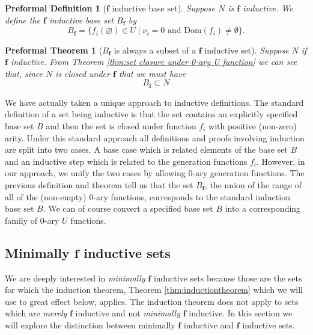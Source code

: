 \documentclass[oneside, 12pt]{book}
\theoremstyle{break}
\newtheorem{preformal definition}[definition]{Preformal Definition}
\newtheorem{preformal theorem}[theorem]{Preformal Theorem}
\newcommand{\bv}[1]{\boldsymbol{#1}}
\begin{document}
				\begin{preformal definition}[$\bv{f}$ inductive base set]
					Suppose $N$ is $\bv{f}$ inductive.
					We define the $\bv{f}$ inductive base set $B_{\bv{f}}$ by
					\begin{equation*}
						B_{\bv{f}} = \{f_i(\varnothing) \in U \mid \nu_i = 0 \text{ and } \text{Dom}(f_i) \neq \emptyset\}.
					\end{equation*}
				\end{preformal definition}				
			
				\begin{preformal theorem}[$B_{\bv{f}}$ is always a subset of a $\bv{f}$ inductive set]
					Suppose $N$ if $\bv{f}$ inductive.
					From Theorem \ref{thm:set closure under 0-ary U function} we can see that, since $N$ is closed under $\bv{f}$ that we must have
					\begin{equation*}
						B_{\bv{f}} \subset N
					\end{equation*}
				\end{preformal theorem}
				
				We have actually taken a unique approach to inductive definitions.
				The standard definition of a set being inductive is that the set contains an explicitly specified base set $B$ and then the set is closed under function $f_i$ with positive (non-zero) arity.
				Under this standard approach all definitions and proofs involving induction are split into two cases.
				A base case which is related elements of the base set $B$ and an inductive step which is related to the generation functions $f_i$.
				However, in our approach, we unify the two cases by allowing 0-ary generation functions.
				The previous definition and theorem tell us that the set $B_{\bv{f}}$, the union of the range of all of the (non-empty) 0-ary functions, corresponds to the standard induction base set $B$.
				We can of course convert a specified base set $B$ into a corresponding family of 0-ary $U$ functions.
			
			\subsection{Minimally $\bv{f}$ inductive sets}
				
				We are deeply interested in \textit{minimally} $\bv{f}$ inductive sets because those are the sets for which the induction theorem, Theorem \ref{thm:inductiontheorem} which we will use to great effect below, applies.
				The induction theorem does not apply to sets which are \textit{merely} $\bv{f}$ inductive and not \textit{minimally} $\bv{f}$ inductive.
				In this section we will explore the distinction between minimally $\bv{f}$ inductive and $\bv{f}$ inductive sets.
				
\end{document}
